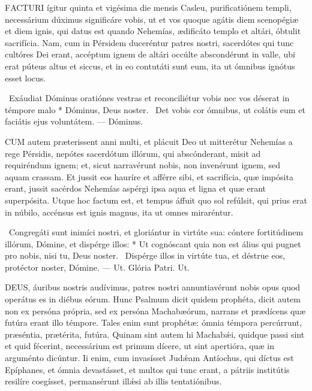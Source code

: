
\lettrine[lines=2]{F}{ACTURI} ígitur quinta et vigésima die mensis Casleu, purificatiónem templi, necessárium dúximus significáre vobis, ut et vos quoque agátis diem scenopégiæ et diem ignis, qui datus est quando Nehemías, ædificáto templo et altári, óbtulit sacrifícia. Nam, cum in Pérsidem duceréntur patres nostri, sacerdótes qui tunc cultóres Dei erant, accéptum ignem de altári occúlte abscondérunt in valle, ubi erat púteus altus et siccus, et in eo contutáti sunt eum, ita ut ómnibus ignótus esset locus.

\R\ Exáudiat Dóminus oratiónes vestras et reconciliétur vobis nec vos déserat in témpore malo * Dóminus, Deus noster. \V\ Det vobis cor ómnibus, ut colátis eum et faciátis ejus voluntátem. — Dóminus.


\lettrine[lines=2]{C}{UM} autem præterissent anni multi, et plácuit Deo ut mitterétur Nehemías a rege Pérsidis, nepótes sacerdótum illórum, qui abscónderant, misit ad requiréndum ignem; et, sicut narravérunt nobis, non invenérunt ignem, sed aquam crassam. Et jussit eos hauríre et afférre sibi, et sacrifícia, quæ impósita erant, jussit sacérdos Nehemías aspérgi ipsa aqua et ligna et quæ erant superpósita. Utque hoc factum est, et tempus áffuit quo sol refúlsit, qui prius erat in núbilo, accénsus est ignis magnus, ita ut omnes miraréntur.

\R\ Congregáti sunt inimíci nostri, et gloriántur in virtúte sua: cóntere fortitúdinem illórum, Dómine, et dispérge illos: * Ut cognóscant quia non est álius qui pugnet pro nobis, nisi tu, Deus noster. \V\ Dispérge illos in virtúte tua, et déstrue eos, protéctor noster, Dómine. — Ut. Glória Patri. Ut.




\lettrine[lines=2]{D}{EUS}, áuribus nostris audívimus, patres nostri annuntiavérunt nobis opus quod operátus es in diébus eórum. Hunc Psalmum dicit quidem prophéta, dicit autem non ex persóna própria, sed ex persóna Machabæórum, narrans et prædícens quæ futúra erant illo témpore. Tales enim sunt prophétæ: ómnia témpora percúrrunt, præséntia, prætérita, futúra. Quinam sint autem hi Machabǽi, quidque passi sint et quid fécerint, necessárium est primum dícere, ut sint apertióra, quæ in arguménto dicúntur. Ii enim, cum invasísset Judǽam Antíochus, qui díctus est Epíphanes, et ómnia devastásset, et multos qui tunc erant, a pátriis institútis resilíre coegísset, permansérunt illǽsi ab illis tentatiónibus.

